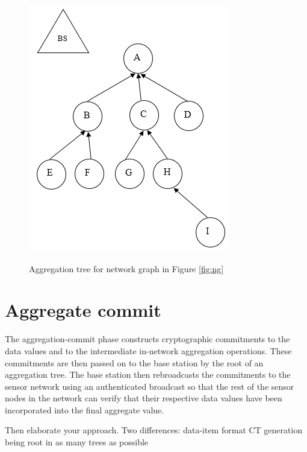 		\begin{figure}[hp]
			\centering
			\includegraphics[scale = 0.7]{images/aggregation-tree.png}\\
			\caption{Aggregation tree for network graph in Figure \ref{fig:ng}}
			\label{fig:at}
		\end{figure}		

	\section{Aggregate commit} 
		\label{sub:aggregate_commit}
		The aggregation-commit phase constructs cryptographic commitments to the data values and to the intermediate in-network aggregation operations.
		These commitments are then passed on to the base station by the root of an aggregation tree.
		The base station then rebroadcasts the commitments to the sensor network using an authenticated broadcast so that the rest of the sensor nodes in the network can verify that their respective data values have been incorporated into the final aggregate value.



Then elaborate your approach.
Two differences:
	data-item format
	CT generation being root in as many trees as possible